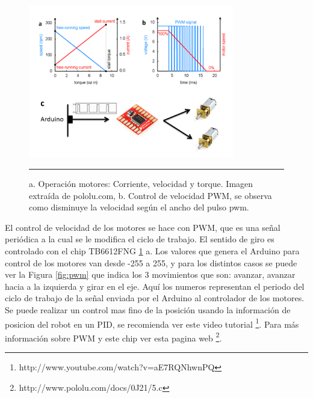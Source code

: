 \begin{figure}[htbp]
	\centering
		\includegraphics[width=0.8\textwidth]{./Figures/graficosMotores.png}
		\rule{35em}{0.5pt}
	\caption[Gráficos Motor DC]{a. Operación motores: Corriente, velocidad y torque. Imagen extraída de pololu.com, b. Control de velocidad PWM, se observa como disminuye la velocidad según el ancho del pulso pwm.}
	\label{fig:DCMotor}
\end{figure}

El control de velocidad de los motores se hace con PWM, que es una señal periódica a la cual se le modifica el ciclo de trabajo. El sentido de giro es controlado con el chip TB6612FNG \ref{fig:DCMotor} a. Los valores que genera el Arduino para control de los motores van desde -255 a 255, y para los distintos casos se puede ver la Figura \ref{fig:pwm} que indica los 3 movimientos que son: avanzar, avanzar hacia a la izquierda y girar en el eje. Aquí los numeros representan el periodo del ciclo de trabajo de la señal enviada por el Arduino al controlador de los motores. Se puede realizar un control mas fino de la posición usando la información de posicion del robot en un PID, se recomienda ver este video tutorial \footnote{http://www.youtube.com/watch?v=aE7RQNhwnPQ}. Para más información sobre PWM y este chip ver esta pagina web \footnote{http://www.pololu.com/docs/0J21/5.c}.

